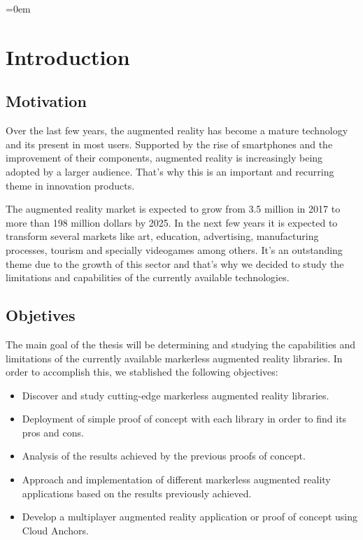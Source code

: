 \parindent=0em
\chapter*{Introduction}
\noindent
\section*{Motivation}
Over the last few years, the augmented reality has become a mature technology and its present in most users. Supported by the rise of smartphones and the improvement of their components, augmented reality is increasingly being adopted by a larger audience. That’s why this is an important and recurring theme in innovation products.

The augmented reality market is expected to grow from 3.5 million in 2017 to more than 198 million dollars by 2025. In the next few years it is expected to transform several markets like art, education, advertising, manufacturing processes, tourism and specially videogames among others. It’s an outstanding theme due to the growth of this sector and that’s why we decided to study the limitations and capabilities of the currently available technologies.


\section*{Objetives}
The main goal of the thesis will be determining and studying the capabilities and limitations of the currently available markerless augmented reality libraries. In order to accomplish this, we stablished the following objectives:

\begin{itemize}
\item Discover and study cutting-edge markerless augmented reality libraries.
\item Deployment of simple proof of concept with each library in order to find its pros and cons.
\item Analysis of the results achieved by the previous proofs of concept.
\item Approach and implementation of different markerless augmented reality applications based on the results previously achieved.
\item Develop a multiplayer augmented reality application or proof of concept using Cloud Anchors.
\end{itemize}


